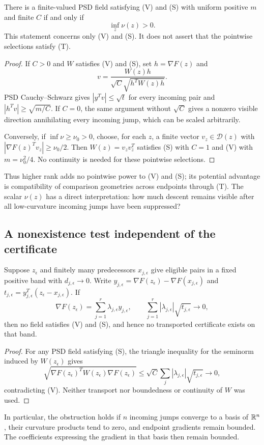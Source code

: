 \begin{proposition}
There is a finite-valued PSD field satisfying (V) and (S) with uniform positive $m$ and finite $C$ if and only if
\[
 \inf_z\nu(z)>0.
\]
This statement concerns only (V) and (S). It does not assert that the pointwise selections satisfy (T).
\end{proposition}
\begin{proof}
If $C>0$ and $W$ satisfies (V) and (S), set $h=\nabla F(z)$ and
\[
 v=\frac{W(z)h}{\sqrt C\sqrt{h^TW(z)h}}.
\]
PSD Cauchy--Schwarz gives $|y^Tv|\le\sqrt t$ for every incoming pair and
$|h^Tv|\ge\sqrt{m/C}$. If $C=0$, the same argument without $\sqrt C$ gives a nonzero visible direction annihilating every incoming jump, which can be scaled arbitrarily.

Conversely, if $\inf\nu\ge\nu_0>0$, choose, for each $z$, a finite vector $v_z\in\mathcal D(z)$ with $|\nabla F(z)^Tv_z|\ge\nu_0/2$. Then $W(z)=v_zv_z^T$ satisfies (S) with $C=1$ and (V) with $m=\nu_0^2/4$. No continuity is needed for these pointwise selections.
\end{proof}
Thus higher rank adds no pointwise power to (V) and (S); its potential advantage is compatibility of comparison geometries across endpoints through (T). The scalar $\nu(z)$ has a direct interpretation: how much descent remains visible after all low-curvature incoming jumps have been suppressed?



\subsection{A nonexistence test independent of the certificate}

\begin{proposition}\label{G:prop:star}
Suppose $z_\epsilon$ and finitely many predecessors $x_{j,\epsilon}$ give eligible pairs in a fixed positive band with $d_{j,\epsilon}\to0$. Write $y_{j,\epsilon}=\nabla F(z_\epsilon)-\nabla F(x_{j,\epsilon})$ and $t_{j,\epsilon}=y_{j,\epsilon}^T(z_\epsilon-x_{j,\epsilon})$. If
\[
 \nabla F(z_\epsilon)=\sum_{j=1}^r\lambda_{j,\epsilon}y_{j,\epsilon},
 \qquad
 \sum_{j=1}^r|\lambda_{j,\epsilon}|\sqrt{t_{j,\epsilon}}\longrightarrow0,
\]
then no field satisfies (V) and (S), and hence no transported certificate exists on that band.
\end{proposition}
\begin{proof}
For any PSD field satisfying (S), the triangle inequality for the seminorm induced by $W(z_\epsilon)$ gives
\[
 \sqrt{\nabla F(z_\epsilon)^TW(z_\epsilon)\nabla F(z_\epsilon)}
 \le\sqrt C\sum_j|\lambda_{j,\epsilon}|\sqrt{t_{j,\epsilon}}\to0,
\]
contradicting (V). Neither transport nor boundedness or continuity of $W$ was used.
\end{proof}
In particular, the obstruction holds if $n$ incoming jumps converge to a basis of $\mathbb R^n$, their curvature products tend to zero, and endpoint gradients remain bounded. The coefficients expressing the gradient in that basis then remain bounded.

